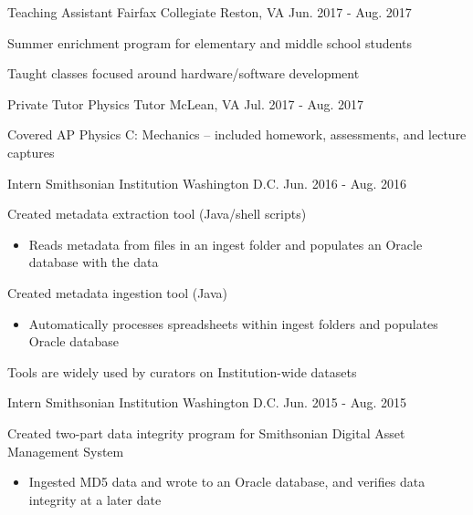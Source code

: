 \begin{cventries}
    \cventry
    {Teaching Assistant}
    {Fairfax Collegiate}
    {Reston, VA}
    {Jun. 2017 - Aug. 2017}
    {
		\begin{cvitems}
		\item{Summer enrichment program for elementary and middle school students}
		\item{Taught classes focused around hardware/software development}
		\end{cvitems}
	}
	\cventry
	{Private Tutor}
	{Physics Tutor}
	{McLean, VA}
	{Jul. 2017 - Aug. 2017}
	{
		\begin{cvitems}
		\item{Covered AP Physics C: Mechanics -- included homework, assessments, and lecture captures}
		\end{cvitems}
	}
    \cventry
    {Intern}
    {Smithsonian Institution}
    {Washington D.C.}
    {Jun. 2016 - Aug. 2016}
    {
        \begin{cvitems}
		\item{Created metadata extraction tool (Java/shell scripts)}
        \begin{itemize}
			\item{Reads metadata from files in an ingest folder and populates an Oracle database with the data}
        \end{itemize}
		\item{Created metadata ingestion tool (Java)}
        \begin{itemize}
			\item{Automatically processes spreadsheets within ingest folders and populates Oracle database}
        \end{itemize}
		\item{Tools are widely used by curators on Institution-wide datasets}
        \end{cvitems}
    }
    \cventry
    {Intern}
    {Smithsonian Institution}
    {Washington D.C.}
    {Jun. 2015 - Aug. 2015}
    {
      \begin{cvitems}
	  \item {Created two-part data integrity program for Smithsonian Digital Asset Management System}
        \begin{itemize}
			\item {Ingested MD5 data and wrote to an Oracle database, and verifies data integrity at a later date}
        \end{itemize}
      \end{cvitems}
}
\end{cventries}

